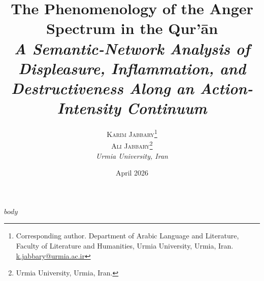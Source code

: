 \documentclass[11pt,a4paper]{article}
\title{\Large\bfseries The Phenomenology of the Anger Spectrum in the Qur'\=an\\[0.4em]
  \normalsize\textit{A Semantic-Network Analysis of Displeasure, Inflammation, and Destructiveness Along an Action-Intensity Continuum}}
\author{
  \textsc{Karim Jabbary}\thanks{Corresponding author. Department of Arabic Language and Literature, Faculty of Literature and Humanities, Urmia University, Urmia, Iran. \href{mailto:k.jabbary@urmia.ac.ir}{k.jabbary@urmia.ac.ir}}\\
  \textsc{Ali Jabbary}\thanks{Urmia University, Urmia, Iran.}\\[0.6em]
  \small\textit{Urmia University, Iran}
}
\date{April 2026}
\begin{document}
\maketitle

$body$
\end{document}
